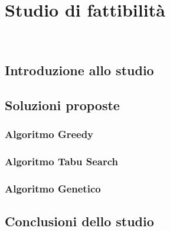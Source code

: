 
\chapter{Studio di fattibilità}
\label{cap:studio-fattibilita}

\\

\section{Introduzione allo studio}

\section{Soluzioni proposte}

\subsection{Algoritmo Greedy}

\subsection{Algoritmo Tabu Search}

\subsection{Algoritmo Genetico}

\section{Conclusioni dello studio}